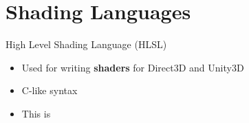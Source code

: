 \part{Shading Languages}
\frame{\partpage}


\begin{frame}{High Level Shading Language (HLSL)}
\begin{itemize}
	\pause\item Used for writing \textbf{shaders} for Direct3D and Unity3D
	\pause\item C-like syntax
	\pause\item This is 
\end{itemize}
\end{frame}
